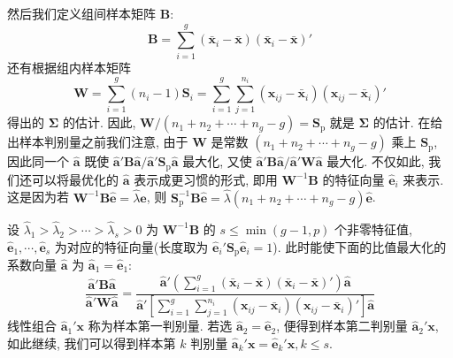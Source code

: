 
然后我们定义组间样本矩阵 $\mathbf{B}$:
\label{eq:11-60}
\begin{equation}
\mathbf{B}=\sum_{i=1}^{g}(\bar{\mathbf{x}}_i-\bar{\mathbf{x}})(\bar{\mathbf{x}}_i-\bar{\mathbf{x}})'
\tag{11-60}
\end{equation}
还有根据组内样本矩阵
\label{eq:11-61}
\begin{equation}
\mathbf{W}=\sum_{i=1}^{g}(n_i-1)\mathbf{S}_i=\sum_{i=1}^{g}\sum_{j=1}^{n_i}(\mathbf{x}_{ij}-\bar{\mathbf{x}}_i)(\mathbf{x}_{ij}-\bar{\mathbf{x}}_i)'
\tag{11-61}
\end{equation}
得出的 $\boldsymbol{\Sigma}$ 的估计. 因此, $\mathbf{W}/(n_1+n_2+\cdots+n_g-g)=\mathbf{S}_{\mathrm{p}}$ 就是 $\boldsymbol{\Sigma}$ 的估计. 在给出样本判别量之前我们注意, 由于 $\mathbf{W}$ 是常数 $(n_1+n_2+\cdots+n_g-g)$ 乘上 $\mathbf{S}_{\mathrm{p}}$, 因此同一个 $\hat{\mathbf{a}}$ 既使 $\hat{\mathbf{a}}'\mathbf{B}\hat{\mathbf{a}}/\hat{\mathbf{a}}'\mathbf{S}_{\mathrm{p}}\hat{\mathbf{a}}$ 最大化, 又使 $\hat{\mathbf{a}}'\mathbf{B}\hat{\mathbf{a}}/\hat{\mathbf{a}}'\mathbf{W}\hat{\mathbf{a}}$ 最大化. 不仅如此, 我们还可以将最优化的 $\hat{\mathbf{a}}$ 表示成更习惯的形式, 即用 $\mathbf{W}^{-1}\mathbf{B}$ 的特征向量 $\hat{\mathbf{e}}_i$ 来表示. 这是因为若 $\mathbf{W}^{-1}\mathbf{B}\hat{\mathbf{e}}=\hat{\lambda}\hat{\mathbf{e}}$, 则 $\mathbf{S}_{\mathrm{p}}^{-1}\mathbf{B}\hat{\mathbf{e}}=\hat{\lambda}(n_1+n_2+\cdots+n_g-g)\hat{\mathbf{e}}$.

\begin{mvframe}[费希尔的样本线性判别函数]
设 $\hat{\lambda}_1>\hat{\lambda}_2>\cdots>\hat{\lambda}_s>0$ 为 $\mathbf{W}^{-1}\mathbf{B}$ 的 $s\le\min(g-1,p)$ 个非零特征值, $\hat{\mathbf{e}}_1,\cdots,\hat{\mathbf{e}}_s$ 为对应的特征向量(长度取为 $\hat{\mathbf{e}}_i'\mathbf{S}_{\mathrm{p}}\hat{\mathbf{e}}_i=1$). 此时能使下面的比值最大化的系数向量 $\hat{\mathbf{a}}$ 为 $\hat{\mathbf{a}}_1=\hat{\mathbf{e}}_1$:
\label{eq:11-62}
\begin{equation}
\frac{\hat{\mathbf{a}}'\mathbf{B}\hat{\mathbf{a}}}{\hat{\mathbf{a}}'\mathbf{W}\hat{\mathbf{a}}}=\frac{\hat{\mathbf{a}}'\left(\sum\limits_{i=1}^{g}(\bar{\mathbf{x}}_i-\bar{\mathbf{x}})(\bar{\mathbf{x}}_i-\bar{\mathbf{x}})'\right)\hat{\mathbf{a}}}{\hat{\mathbf{a}}'\left[\sum\limits_{i=1}^{g}\sum\limits_{j=1}^{n_i}(\mathbf{x}_{ij}-\bar{\mathbf{x}}_i)(\mathbf{x}_{ij}-\bar{\mathbf{x}}_i)'\right]\hat{\mathbf{a}}}
\tag{11-62}
\end{equation}
线性组合 $\hat{\mathbf{a}}_1'\mathbf{x}$ 称为样本第一判别量. 若选 $\hat{\mathbf{a}}_2=\hat{\mathbf{e}}_2$, 便得到样本第二判别量 $\hat{\mathbf{a}}_2'\mathbf{x}$, 如此继续, 我们可以得到样本第 $k$ 判别量 $\hat{\mathbf{a}}_k'\mathbf{x}=\hat{\mathbf{e}}_k'\mathbf{x}, k\le s$.
\end{mvframe}

